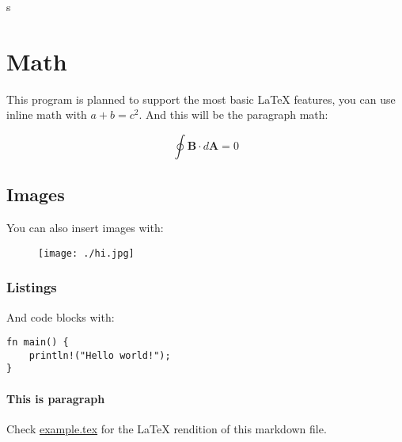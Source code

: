 \documentclass[12pt, a4paper]{article}
\begin{document}
s
    \section{Math}

    This program is planned to support the most basic LaTeX features, you can use inline math with $a + b = c^2$. And this will be the paragraph math:

    \begin{equation}
        \oint \boldsymbol{B} \cdot d \boldsymbol{A} = 0
    \end{equation}

    \subsection{Images}

    You can also insert images with:

    \begin{figure}[h]
        \texttt{[image: ./hi.jpg]}
    \end{figure}

    \subsubsection{Listings}

    And code blocks with:

\begin{lstlisting}
fn main() {
    println!("Hello world!");
}
\end{lstlisting}

    \paragraph{This is paragraph}

    Check \href{./example.tex}{example.tex} for the LaTeX rendition of this markdown file.
\end{document}
